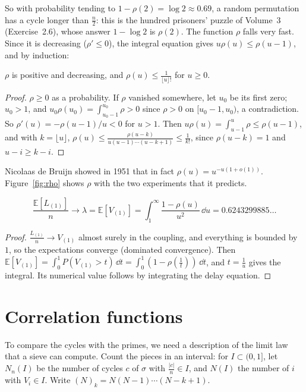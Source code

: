 So with probability tending to $1-\rho(2)=\log2\approx0.69$, a random permutation has a cycle longer than $\frac n2$: this is the hundred prisoners' puzzle of Volume~3 (Exercise~2.6), whose answer $1-\log2$ is $\rho(2)$. The function $\rho$ falls very fast. Since it is
decreasing ($\rho'\le0$), the integral equation gives $u\rho(u)\le\rho(u-1)$, and by induction:

\begin{proposition}\label{prop:rhobound}
$\rho$ is positive and decreasing, and $\rho(u)\le\frac1{\lfloor u\rfloor!}$ for $u\ge0$.
\end{proposition}
\begin{proof}
$\rho\ge0$ as a probability. If $\rho$ vanished somewhere, let $u_0$ be its first zero; $u_0>1$, and $u_0\rho(u_0)=\int_{u_0-1}^{u_0}\rho>0$ since $\rho>0$ on $[u_0-1,u_0)$, a contradiction. So $\rho'(u)=-\rho(u-1)/u<0$ for $u>1$. Then $u\rho(u)=\int_{u-1}^u\rho\le\rho(u-1)$, and with
$k=\lfloor u\rfloor$, $\rho(u)\le\frac{\rho(u-k)}{u(u-1)\cdots(u-k+1)}\le\frac1{k!}$, since $\rho(u-k)=1$ and $u-i\ge k-i$.
\end{proof}

Nicolaas de Bruijn showed in 1951 that in fact $\rho(u)=u^{-u(1+o(1))}$. Figure~\ref{fig:rho} shows $\rho$ with the two experiments that it predicts.

\begin{corollary}\label{cor:golomb}
\[
\frac{\mathbb E[L_{(1)}]}n\longrightarrow\lambda=\mathbb E[V_{(1)}]=\int_1^\infty\frac{1-\rho(u)}{u^2}\,\dd u=0.6243299885\ldots
\]
\end{corollary}
\begin{proof}
$\frac{L_{(1)}}n\to V_{(1)}$ almost surely in the coupling, and everything is bounded by $1$, so the expectations converge (dominated convergence). Then $\mathbb E[V_{(1)}]=\int_0^1P(V_{(1)}>t)\,\dd t=\int_0^1(1-\rho(\frac1t))\,\dd t$, and $t=\frac1u$ gives the integral. Its numerical value follows by integrating the delay equation.
\end{proof}

\section{Correlation functions}

To compare the cycles with the primes, we need a description of the limit law that a sieve can compute. Count the pieces in an interval: for $I\subset(0,1]$, let $N_n(I)$ be the number of cycles $c$ of $\sigma$ with $\frac{|c|}n\in I$, and $N(I)$ the number of $i$ with $V_i\in I$.
Write $(N)_k=N(N-1)\cdots(N-k+1)$.


